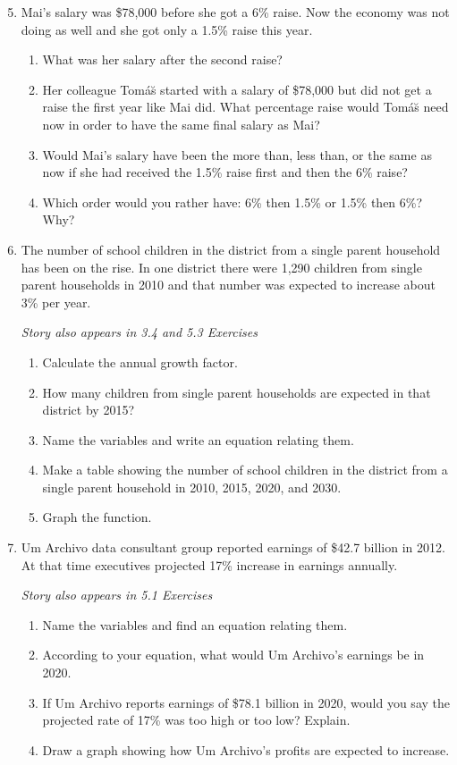 \begin{enumerate} 
\setcounter{enumi}{4}

\item Mai's salary was \$78,000 before she got a 6\% raise.  Now the economy was not doing as well and she got only a 1.5\% raise this year.
\begin{enumerate}
\item What was her salary after the second raise?
\item Her colleague Tom\'a\u s started with a salary of \$78,000 but did not get a raise the first year like Mai did.  What percentage raise would Tom\'a\u s need now in order to have the same final salary as Mai?
\item Would Mai's salary have been the more than, less than, or the same as now if she had received the 1.5\% raise first and then the 6\% raise?
\item Which order would you rather have:  6\% then 1.5\% or 1.5\% then 6\%?  Why?
\end{enumerate}

\item The number of school children in the district from a single parent household has been on the rise.  In one district there were 1,290 children from single parent households in 2010 and that number was expected to increase about 3\% per year.

\hfill \emph{Story also appears in 3.4 and 5.3 Exercises}
\begin{enumerate}
\item Calculate the annual growth factor.
\item How many children from single parent households are expected in that district by 2015?
\item Name the variables and write an equation relating them.
\item Make a table showing the number of school children in the district from a single parent household in 2010, 2015, 2020, and 2030.
\item Graph the function.  
\end{enumerate}

\item Um Archivo data consultant group reported earnings of \$42.7 billion in 2012.  At that time executives projected 17\% increase in earnings annually. 

 \hfill \emph{Story also appears in 5.1 Exercises}
\begin{enumerate}
\item Name the variables and find an equation relating them.
\item According to your equation, what would Um Archivo's earnings be in 2020.
\item If Um Archivo reports earnings of \$78.1 billion in 2020, would you say the projected rate of 17\% was too high or too low?  Explain.
\item Draw a graph showing how Um Archivo's profits are expected to increase.
\end{enumerate}  


\end{enumerate}
